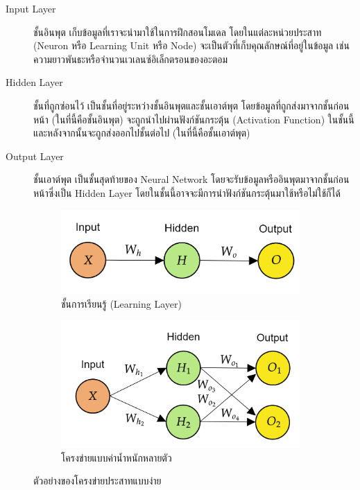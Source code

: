 \begin{description}
    \item[Input Layer] ชั้นอินพุต เก็บข้อมูลที่เราจะนำมาใช้ในการฝึกสอนโมเดล โดยในแต่ละหน่วยประสาท (Neuron หรือ Learning Unit 
    หรือ Node) จะเป็นตัวที่เก็บคุณลักษณ์ที่อยู่ในข้อมูล เช่น ความยาวพันธะหรือจำนวนเวเลนซ์อิเล็กตรอนของอะตอม
    
    \item[Hidden Layer] ชั้นที่ถูกซ่อนไว้ เป็นชั้นที่อยู่ระหว่างชั้นอินพุตและชั้นเอาต์พุต โดยข้อมูลที่ถูกส่งมาจากชั้นก่อนหน้า (ในที่นี้คือชั้นอินพุต)
    จะถูกนำไปผ่านฟังก์ชันกระตุ้น (Activation Function) ในชั้นนี้ และหลังจากนั้นจะถูกส่งออกไปชั้นต่อไป (ในที่นี้คือชั้นเอาต์พุต)
    
    \item[Output Layer] ชั้นเอาต์พุต เป็นชั้นสุดท้ายของ Neural Network โดยจะรับข้อมูลหรืออินพุตมาจากชั้นก่อนหน้าซึ่งเป็น Hidden 
    Layer โดยในชั้นนี้อาจจะมีการนำฟังก์ชันกระตุ้นมาใช้หรือไม่ใช้ก็ได้
\end{description}

\begin{figure}[htbp]
    \centering
    \begin{subfigure}{0.5\textwidth}
        \centering
        \includegraphics[width=0.9\linewidth]{fig/nn_layer.png}
        \caption{ชั้นการเรียนรู้ (Learning Layer)}
        \label{fig:nn_layer}
    \end{subfigure}%
    \begin{subfigure}{0.5\textwidth}
        \centering
        \includegraphics[width=0.9\linewidth]{fig/nn_w_matrices.png}
        \caption{โครงข่ายแบบค่าน้ำหนักหลายตัว}
        \label{fig:nn_w_matrices}
    \end{subfigure}
    \caption{ตัวอย่างของโครงข่ายประสาทแบบง่าย}
    \label{fig:nn_layer_w}
\end{figure}

